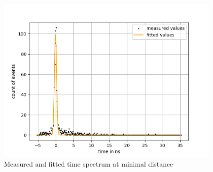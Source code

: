 \begin{figure}[H]
    \centering
    \includegraphics[width=110mm,scale=0.5]{Positronium/include/lightspeed fits0.png}
    \caption{Measured and fitted time spectrum at minimal distance} 
    
\end{figure}
